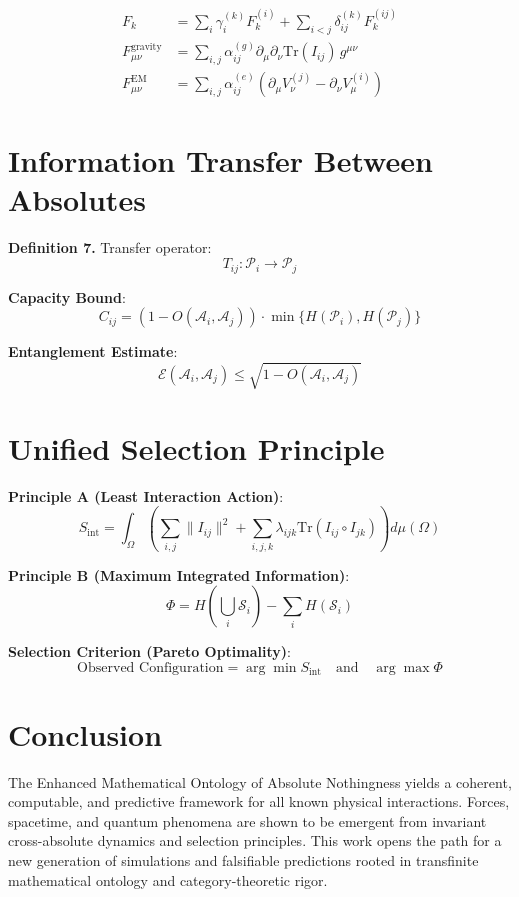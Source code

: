 \documentclass[11pt]{article}
\begin{document}
\begin{align*}
F_k &= \sum_i \gamma^{(k)}_i F_k^{(i)} + \sum_{i<j} \delta^{(k)}_{ij} F_k^{(ij)} \\
F^{\mathrm{gravity}}_{\mu\nu} &= \sum_{i,j} \alpha^{(g)}_{ij} \partial_\mu \partial_\nu \mathrm{Tr}(I_{ij}) \, g^{\mu\nu} \\
F^{\mathrm{EM}}_{\mu\nu} &= \sum_{i,j} \alpha^{(e)}_{ij} \left( \partial_\mu V^{(j)}_\nu - \partial_\nu V^{(i)}_\mu \right)
\end{align*}

\section{Information Transfer Between Absolutes}

\textbf{Definition 7.} Transfer operator:
\[
T_{ij} : \mathcal{P}_i \rightarrow \mathcal{P}_j
\]

\textbf{Capacity Bound}:
\[
C_{ij} = (1 - O(\mathcal{A}_i, \mathcal{A}_j)) \cdot \min\{H(\mathcal{P}_i), H(\mathcal{P}_j)\}
\]

\textbf{Entanglement Estimate}:
\[
\mathcal{E}(\mathcal{A}_i, \mathcal{A}_j) \leq \sqrt{1 - O(\mathcal{A}_i, \mathcal{A}_j)}
\]

\section{Unified Selection Principle}

\textbf{Principle A (Least Interaction Action)}:
\[
S_{\mathrm{int}} = \int_\Omega \left( \sum_{i,j} \|I_{ij}\|^2 + \sum_{i,j,k} \lambda_{ijk} \mathrm{Tr}(I_{ij} \circ I_{jk}) \right) d\mu(\Omega)
\]

\textbf{Principle B (Maximum Integrated Information)}:
\[
\Phi = H\left( \bigcup_i \mathcal{S}_i \right) - \sum_i H(\mathcal{S}_i)
\]

\textbf{Selection Criterion (Pareto Optimality)}:
\[
\text{Observed Configuration} = \arg\min S_{\mathrm{int}} \quad \text{and} \quad \arg\max \Phi
\]

\section{Conclusion}

The Enhanced Mathematical Ontology of Absolute Nothingness yields a coherent, computable, and predictive framework for all known physical interactions. Forces, spacetime, and quantum phenomena are shown to be emergent from invariant cross-absolute dynamics and selection principles. This work opens the path for a new generation of simulations and falsifiable predictions rooted in transfinite mathematical ontology and category-theoretic rigor.



\end{document}
